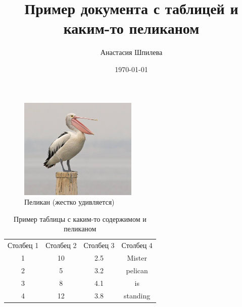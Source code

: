 \documentclass{article}
\title{Пример документа с таблицей и каким-то пеликаном}
\author{Анастасия Шпилева}
\date{\today}
\begin{document}
\maketitle

\begin{figure}[htbp]
\centering
\includegraphics[width=0.5\textwidth]{artifacts/image.jpg}
\caption{Пеликан (жестко удивляется)}
\label{fig:example}
\end{figure}

\begin{table}[htbp]
\centering
\caption{Пример таблицы с каким-то 
 содержимом и пеликаном}
\label{tab:pelicans}
\begin{tabular}{|cccc|}
\hline
Столбец 1 & Столбец 2 & Столбец 3 & Столбец 4 \\
1 & 10 & 2.5 & Mister \\
2 & 5 & 3.2 & pelican \\
3 & 8 & 4.1 & is \\
4 & 12 & 3.8 & standing \\
\hline
\end{tabular}
\end{table}
\end{document}
